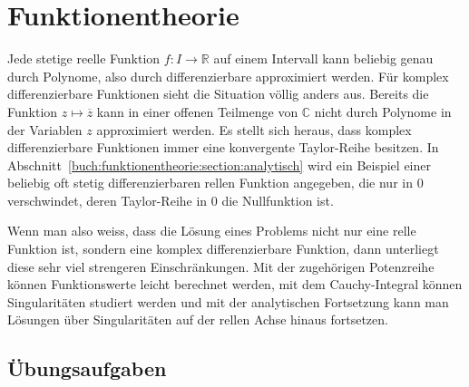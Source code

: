 %
%
%
\chapter{Funktionentheorie
\label{buch:chapter:funktionentheorie}}
\rhead{}
Jede stetige reelle Funktion $f\colon I\to\mathbb{R}$ auf einem
Intervall kann beliebig genau durch Polynome, also durch
differenzierbare approximiert werden.
Für komplex differenzierbare Funktionen sieht die Situation
völlig anders aus.
Bereits die Funktion $z\mapsto \overline{z}$ kann in einer offenen
Teilmenge von $\mathbb{C}$ nicht durch Polynome in der Variablen $z$
approximiert werden.
Es stellt sich heraus, dass komplex differenzierbare Funktionen
immer eine konvergente Taylor-Reihe besitzen.
In Abschnitt~\ref{buch:funktionentheorie:section:analytisch} wird
ein Beispiel einer beliebig oft stetig differenzierbaren rellen
Funktion angegeben, die nur in $0$ verschwindet, deren Taylor-Reihe
in $0$ die Nullfunktion ist.

Wenn man also weiss, dass die Lösung eines Problems nicht nur eine
relle Funktion ist, sondern eine komplex differenzierbare Funktion,
dann unterliegt diese sehr viel strengeren Einschränkungen.
Mit der zugehörigen Potenzreihe können Funktionswerte leicht berechnet
werden, mit dem Cauchy-Integral können Singularitäten studiert werden
und mit der analytischen Fortsetzung kann man Lösungen über Singularitäten
auf der rellen Achse hinaus fortsetzen.







\section*{Übungsaufgaben}
\begin{uebungsaufgaben}
\end{uebungsaufgaben}

